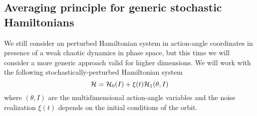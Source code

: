 \subsection{Averaging principle for generic stochastic Hamiltonians}

We still consider an perturbed Hamiltonian system in action-angle coordinates in presence of a weak chaotic dynamics in phase space, but this time we will consider a more generic approach valid for higher dimensions. We will work with the following stochastically-perturbed Hamiltonian system
\begin{equation}
	\mathcal{H} = \mathcal{H}_0(I) + \xi(t)\mathcal{H}_1(\theta, I)
\end{equation}
where \((\theta, I)\) are the multidimensional action-angle variables and the noise realization \(\xi(t)\) depends on the initial conditions of the orbit.

